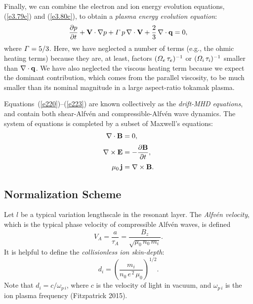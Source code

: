 \documentclass[notitlepage,12pt]{article}
\begin{document}
Finally, we can combine the electron and ion energy evolution equations, (\ref{e3.79c}) and (\ref{e3.80c}), to obtain
a {\em plasma energy evolution equation}:
\begin{equation}
\frac{\partial p}{\partial t} + {\bf V}\cdot\nabla p + {\mit\Gamma}\,p\,\nabla\cdot{\bf V} + \frac{2}{3}\,\nabla\cdot {\bf q}=0, 
\label{e223}
\end{equation}
where ${\mit\Gamma}=5/3$. Here, we have neglected a number of  terms (e.g., the ohmic heating terms) because they
are, at least, factors $({\mit\Omega}_e\,\tau_e)^{-1}$ or  $({\mit\Omega}_i\,\tau_i)^{-1}$ smaller than $\nabla\cdot{\bf q}$. We have also neglected the viscous heating term because we
expect the dominant contribution, which comes from the parallel viscosity, to be much smaller than its nominal magnitude in a large aspect-ratio tokamak
plasma. 

Equations~(\ref{e220})--(\ref{e223}) are known collectively as the {\em drift-MHD equations}, and contain both shear-Alfv\'{e}n
and compressible-Alfv\'{e}n wave dynamics. The system of equations is completed by a subset of Maxwell's equations:
\begin{align}
\nabla\cdot{\bf B} &= 0,\\[0.5ex]
\nabla\times {\bf E} &= - \frac{\partial {\bf B}}{\partial t},\\[0.5ex]
\mu_0\,{\bf j} &= \nabla \times {\bf B}.\label{e226}
\end{align}

\subsection{Normalization Scheme}\label{s4.3}
Let $l$ be a typical variation lengthscale in the resonant layer. The {\em Alfv\'{e}n velocity}, which is the typical phase
velocity of compressible Alfv\'{e}n waves, is defined
\begin{equation}\label{e226a}
V_A =\frac{a}{\tau_A}= \frac{B_z}{\sqrt{\mu_0\,n_0\,m_i}}.
\end{equation}
It is helpful to define the  {\em collisionless ion skin-depth}: 
\begin{equation}
d_i = \left(\frac{m_i}{n_0\,e^{\,2}\,\mu_0}\right)^{1/2}.
\end{equation}
Note that $d_i=c/\omega_{p\,i}$, where $c$ is the velocity of light in vacuum, and $\omega_{p\,i}$ is the ion plasma
frequency (Fitzpatrick 2015). 
\end{document}
